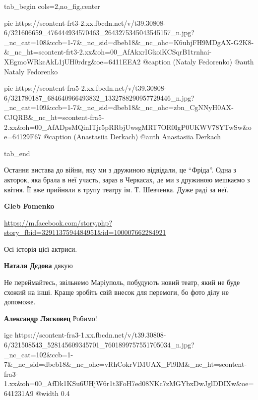 \begin{center}
\begin{minipage}{\textwidth}

\ifcmt
  tab_begin cols=2,no_fig,center

     pic https://scontent-frt3-2.xx.fbcdn.net/v/t39.30808-6/321606659_476444934570463_2643275345043545157_n.jpg?_nc_cat=108&ccb=1-7&_nc_sid=dbeb18&_nc_ohc=K6uhjFH9MDgAX-G2K8-&_nc_ht=scontent-frt3-2.xx&oh=00_AfAkxrIGkoiKCSqrB1trnhai-XEgmoWRkcAkL1jUH0rdrg&oe=6411EEA2
     @caption (Nataly Fedorenko)
     @auth Nataly Fedorenko

     pic https://scontent-fra5-2.xx.fbcdn.net/v/t39.30808-6/321780187_684640966493832_1332788290957729446_n.jpg?_nc_cat=109&ccb=1-7&_nc_sid=dbeb18&_nc_ohc=zbn_CgNNyH0AX-CJQRB&_nc_ht=scontent-fra5-2.xx&oh=00_AfADpsMQinITjr5pRRbjUwsgMRT7OR0IgP0UKWV78YTwSw&oe=64129F67
     @caption (Anastasiia Derkach)
     @auth Anastasiia Derkach

  tab_end
\fi
\end{minipage}
\end{center}


Остання вистава до війни, яку ми з дружиною відвідали, це \enquote{Фріда}. Одна з
акторок, яка брала в неї участь, зараз в Черкасах, де ми з дружиною мешкаємо з
квітня. Її вже прийняли в трупу театру ім. Т. Шевченка. Дуже раді за неї.

\begin{itemize} %
\textbf{Gleb Fomenko}

\url{https://m.facebook.com/story.php?story_fbid=3291137594484951&id=100007662284921}

Осі історія цієї актриси.

\textbf{Наталя Дєдова} дякую
\end{itemize} %


Не переймайтесь, звільнемо Маріуполь, побудують новий театр, який не буде
схожий на інші. Краще зробіть свій внесок для перемоги, бо фото ділу не
допоможе.

\begin{itemize} %
\textbf{Александр Лясковец} Робимо! 💙💛
\end{itemize} %


\ifcmt
  igc https://scontent-fra3-1.xx.fbcdn.net/v/t39.30808-6/321508543_528145609345701_7601899757551705034_n.jpg?_nc_cat=102&ccb=1-7&_nc_sid=dbeb18&_nc_ohc=vRhCokrVlMUAX_Fl9lM&_nc_ht=scontent-fra3-1.xx&oh=00_AfDk1KSu6UHjW6r1t3FoH7ed08NKc7zMGYbxDwJglDDIXw&oe=641231A9
  @width 0.4
\fi
